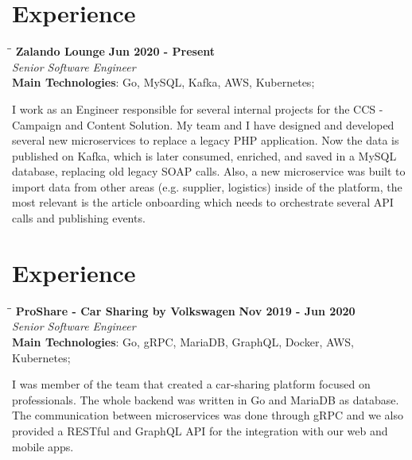 \documentclass[margin]{res}
\begin{document}
\begin{resume}
\section{Experience}
\vspace{-0.1in}
    \begin{tabbing}
    \hspace{2.3in}\= \hspace{1.7in}\= \kill %
    \textbf{Zalando Lounge}    \>\>\textbf{Jun 2020 - Present}\\
    \textit{Senior Software Engineer}\\
    \textbf{Main Technologies}: Go, MySQL, Kafka, AWS, Kubernetes;
    \end{tabbing}\vspace{-20pt}      %
    \vspace{2mm}
I work as an Engineer responsible for several internal projects for the CCS - Campaign and Content Solution. My team and I have designed and developed several new microservices to replace a legacy PHP application. Now the data is published on Kafka, which is later consumed, enriched, and saved in a MySQL database, replacing old legacy SOAP calls. Also, a new microservice was built to import data from other areas (e.g. supplier, logistics) inside of the platform, the most relevant is the article onboarding which needs to orchestrate several API calls and publishing events.

\section{Experience}
\vspace{-0.1in}
    \begin{tabbing}
    \hspace{2.3in}\= \hspace{1.7in}\= \kill %
    \textbf{ProShare - Car Sharing by Volkswagen}    \>\>\textbf{Nov 2019 - Jun 2020}\\
    \textit{Senior Software Engineer}\\
    \textbf{Main Technologies}: Go, gRPC, MariaDB, GraphQL, Docker, AWS, Kubernetes;
    \end{tabbing}\vspace{-20pt}      %
    \vspace{2mm}
I was member of the team that created a car-sharing platform focused on professionals. The whole backend was written in Go and MariaDB as database. The communication between microservices was done through gRPC and we also provided a RESTful and GraphQL API for the integration with our web and mobile apps.


\end{resume}
\end{document}
